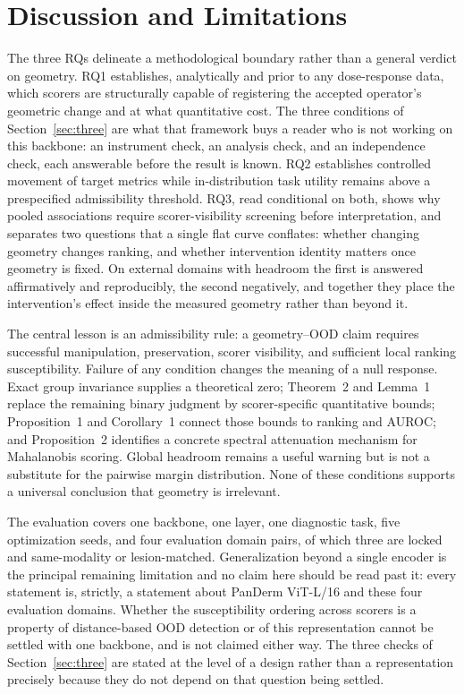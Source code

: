 \documentclass[11pt,a4paper]{article}
\begin{document}
\section{Discussion and Limitations}
The three RQs delineate a methodological boundary rather than a general verdict on geometry. RQ1 establishes, analytically and prior to any dose-response data, which scorers are structurally capable of registering the accepted operator's geometric change and at what quantitative cost. The three conditions of Section~\ref{sec:three} are what that framework buys a reader who is not working on this backbone: an instrument check, an analysis check, and an independence check, each answerable before the result is known. RQ2 establishes controlled movement of target metrics while in-distribution task utility remains above a prespecified admissibility threshold. RQ3, read conditional on both, shows why pooled associations require scorer-visibility screening before interpretation, and separates two questions that a single flat curve conflates: whether changing geometry changes ranking, and whether intervention identity matters once geometry is fixed. On external domains with headroom the first is answered affirmatively and reproducibly, the second negatively, and together they place the intervention's effect inside the measured geometry rather than beyond it.

The central lesson is an admissibility rule: a geometry--OOD claim requires successful manipulation, preservation, scorer visibility, and sufficient local ranking susceptibility. Failure of any condition changes the meaning of a null response. Exact group invariance supplies a theoretical zero; Theorem~2 and Lemma~1 replace the remaining binary judgment by scorer-specific quantitative bounds; Proposition~1 and Corollary~1 connect those bounds to ranking and AUROC; and Proposition~2 identifies a concrete spectral attenuation mechanism for Mahalanobis scoring. Global headroom remains a useful warning but is not a substitute for the pairwise margin distribution. None of these conditions supports a universal conclusion that geometry is irrelevant.

The evaluation covers one backbone, one layer, one diagnostic task, five optimization seeds, and four evaluation domain pairs, of which three are locked and same-modality or lesion-matched. Generalization beyond a single encoder is the principal remaining limitation
and no claim here should be read past it: every statement is, strictly, a
statement about PanDerm ViT-L/16 and these four evaluation domains. Whether the
susceptibility ordering across scorers is a property of distance-based OOD
detection or of this representation cannot be settled with one backbone, and is
not claimed either way. The three checks of Section~\ref{sec:three} are stated
at the level of a design rather than a representation precisely because they do
not depend on that question being settled.
\end{document}
